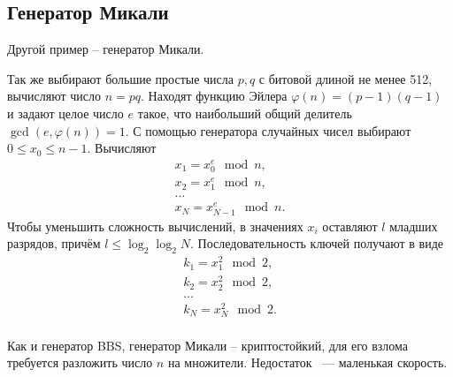 \subsection{Генератор Микали}

Другой пример -- генератор Микали.

Так же выбирают большие простые числа $p,q$ с битовой длиной не менее 512, вычисляют число $n = pq$. Находят функцию Эйлера $\varphi(n) = (p-1) (q-1)$ и задают целое число $e$ такое, что наибольший общий делитель $\gcd(e, \varphi(n)) = 1$. С помощью генератора случайных чисел выбирают $0 \leq x_{0} \leq n-1$. Вычисляют
\[ \begin{array}{l}
    x_1 = x_0^e \mod n, \\
    x_2 = x_1^e \mod n, \\
    \dots \\
    x_N = x_{N-1}^e \mod n.
\end{array} \]
Чтобы уменьшить сложность вычислений, в значениях $x_i$ оставляют $l$ младших разрядов, причём $l \leq \log_2 \log_2 N$. Последовательность ключей получают в виде
\[ \begin{array}{l}
    k_1 = x_1^2 \mod 2, \\
    k_2 = x_2^2 \mod 2, \\
    \dots \\
    k_N = x_N^2 \mod 2. \\
\end{array} \]

Как и генератор BBS, генератор Микали -- криптостойкий, для его взлома требуется разложить число $n$ на множители. Недостаток ~--- маленькая скорость.
